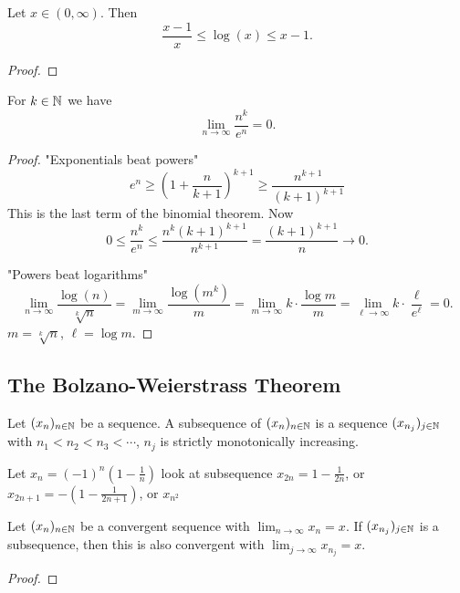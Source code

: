 \documentclass[10pt, a4paper]{article}
\newcommand{\seq}[1][x]{(#1_n)_{n \in \N}}
\begin{document}
\begin{lemma}
    Let $x \in (0, \infty)$.
    Then 
    \[
    \frac{x - 1}{x} \leq \log(x) \leq x - 1.
    \]
    \begin{proof}
        
    \end{proof}
\end{lemma}

\begin{example}
    For $k \in \mathbb{N}$ we have
    \[
    \lim_{n \rightarrow \infty}\frac{n ^ k}{e ^ n} = 0.
    \]
    \begin{proof}
        "Exponentials beat powers"
        \[
        e ^ n \geq \left(1 + \frac{n}{k + 1}\right) ^ {k + 1} \geq \frac{n ^ {k + 1}}{(k + 1) ^ {k + 1}}
        \]
        This is the last term of the binomial theorem.
        Now
        \[
        0 \leq \frac{n ^ k}{e ^ n} \leq \frac{n ^ k(k + 1) ^ {k + 1}}{n ^ {k + 1}} = \frac{(k + 1) ^ {k + 1}}{n} \rightarrow 0.
        \]
        
        "Powers beat logarithms"
        \[
        \lim_{n \rightarrow \infty}\frac{\log(n)}{\sqrt[k]{n}} = \lim_{m \rightarrow \infty}\frac{\log(m ^ k)}{m} = \lim_{m \rightarrow \infty}k \cdot \frac{\log m}{m} = \lim_{\ell \rightarrow \infty}k \cdot \frac{\ell}{e ^ \ell} = 0.
        \]
        $m = \sqrt[k]{n}$,
        $\ell = \log m$.
    \end{proof}
\end{example}

\subsection{The Bolzano-Weierstrass Theorem}
\begin{definition}
    Let $\seq$ be a sequence.
    A subsequence of $\seq$ is a sequence $(x_{n_j})_{j \in \mathbb{N}}$ with
    $n_1 < n_2 < n_3 < \dotsi$,
    $n_j$ is strictly monotonically increasing.
\end{definition}

\begin{example}
    Let $x_n = (-1) ^ n\left(1 - \frac{1}{n}\right)$
    look at subsequence $x_{2n} = 1 - \frac{1}{2n}$,
    or $x_{2n + 1} = -\left(1 - \frac{1}{2n + 1}\right)$,
    or $x_{n ^ 2}$
\end{example}

\begin{proposition}
    Let $\seq$ be a convergent sequence with $\displaystyle\lim_{n \rightarrow \infty}x_n = x$.
    If $(x_{n_j})_{j \in \mathbb{N}}$ is a subsequence,
    then this is also convergent with $\displaystyle\lim_{j \rightarrow \infty}x_{n_j} = x$.
    \begin{proof}
        
    \end{proof}
\end{proposition}
\end{document}
